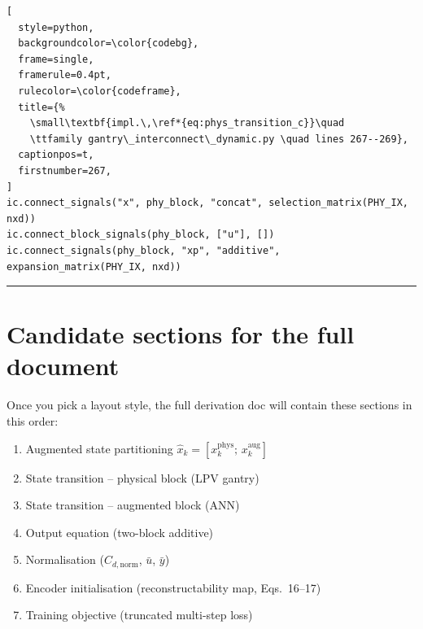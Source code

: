 \documentclass[11pt,a4paper]{article}
\begin{document}
\begin{lstlisting}[
  style=python,
  backgroundcolor=\color{codebg},
  frame=single,
  framerule=0.4pt,
  rulecolor=\color{codeframe},
  title={%
    \small\textbf{impl.\,\ref*{eq:phys_transition_c}}\quad
    \ttfamily gantry\_interconnect\_dynamic.py \quad lines 267--269},
  captionpos=t,
  firstnumber=267,
]
ic.connect_signals("x", phy_block, "concat", selection_matrix(PHY_IX, nxd))
ic.connect_block_signals(phy_block, ["u"], [])
ic.connect_signals(phy_block, "xp", "additive", expansion_matrix(PHY_IX, nxd))
\end{lstlisting}

\bigskip
\hrule
\bigskip

\section*{Candidate sections for the full document}

Once you pick a layout style, the full derivation doc will contain these sections
in this order:

\begin{enumerate}
  \item Augmented state partitioning $\hat{x}_k = [x^\mathrm{phys}_k;\, x^\mathrm{aug}_k]$
  \item State transition -- physical block (LPV gantry)
  \item State transition -- augmented block (ANN)
  \item Output equation (two-block additive)
  \item Normalisation ($C_{d,\mathrm{norm}}$, $\bar{u}$, $\bar{y}$)
  \item Encoder initialisation (reconstructability map, Eqs.\ 16--17)
  \item Training objective (truncated multi-step loss)
\end{enumerate}
\end{document}
